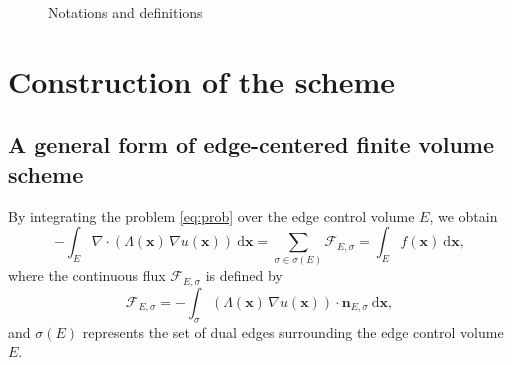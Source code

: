 \documentclass[times,review,preprint]{elsarticle}
\newcommand{\bx}{\bm{x}}
\newcommand{\bn}{\bm{n}}
\begin{document}
\begin{figure}[h]
\centering
{}\label{fig:pdmesh}
\caption{Notations and definitions}
\end{figure}

\section{Construction of the scheme}\label{sec3}

\subsection{A general form of edge-centered finite volume scheme}

By integrating the problem \cref{eq:prob} over the edge control volume $E$, we obtain
\begin{equation}
- \int_{E} \nabla \cdot (\Lambda(\bx) \, \nabla u(\bx)) \ \mathrm{d} \bx = \sum_{\sigma \in \sigma(E)} \mathcal{F}_{E, \sigma} = \int_{E} f(\bx) \ \mathrm{d} \bx,
\end{equation}
where the continuous flux $\mathcal{F}_{E, \sigma}$ is defined by
\begin{equation*}
\mathcal{F}_{E, \sigma} = - \int_{\sigma} (\Lambda(\bx) \, \nabla u(\bx)) \cdot \bn_{E, \sigma} \ \mathrm{d} \bx,
\end{equation*}
and $\sigma(E)$ represents the set of dual edges surrounding the edge control volume $E$.
\end{document}
